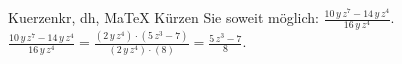 \begin{MAufgabe}{Kuerzen}{kr, dh, MaTeX}
K\"urzen Sie soweit m\"oglich: $\frac{10\, y\, z^7 - 14\, y\, z^4}{16\, y\, z^4}$.\\ 
\ifLsg\MLoesung
\quad $\frac{10\, y\, z^7 - 14\, y\, z^4}{16\, y\, z^4}=\frac{(2\, y\, z^4)\cdot(5\, z^3 - 7)}{(2\, y\, z^4)\cdot(8)}=\frac{5\, z^3 - 7}{8}$.\else\relax\fi
 \end{MAufgabe}